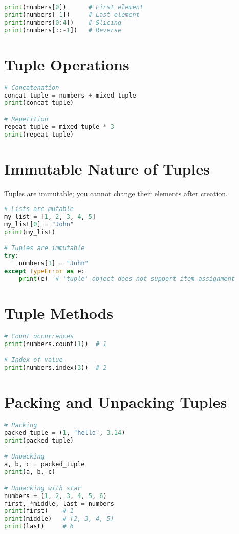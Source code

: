 \begin{lstlisting}[language=Python]
print(numbers[0])      # First element
print(numbers[-1])     # Last element
print(numbers[0:4])    # Slicing
print(numbers[::-1])   # Reverse
\end{lstlisting}

\section{Tuple Operations}

\begin{lstlisting}[language=Python]
# Concatenation
concat_tuple = numbers + mixed_tuple
print(concat_tuple)

# Repetition
repeat_tuple = mixed_tuple * 3
print(repeat_tuple)
\end{lstlisting}

\section{Immutable Nature of Tuples}

Tuples are immutable; you cannot change their elements after creation.

\begin{lstlisting}[language=Python]
# Lists are mutable
my_list = [1, 2, 3, 4, 5]
my_list[0] = "John"
print(my_list)

# Tuples are immutable
try:
    numbers[1] = "John"
except TypeError as e:
    print(e)  # 'tuple' object does not support item assignment
\end{lstlisting}

\section{Tuple Methods}

\begin{lstlisting}[language=Python]
# Count occurrences
print(numbers.count(1))  # 1

# Index of value
print(numbers.index(3))  # 2
\end{lstlisting}

\section{Packing and Unpacking Tuples}

\begin{lstlisting}[language=Python]
# Packing
packed_tuple = (1, "hello", 3.14)
print(packed_tuple)

# Unpacking
a, b, c = packed_tuple
print(a, b, c)

# Unpacking with star
numbers = (1, 2, 3, 4, 5, 6)
first, *middle, last = numbers
print(first)    # 1
print(middle)   # [2, 3, 4, 5]
print(last)     # 6
\end{lstlisting}

